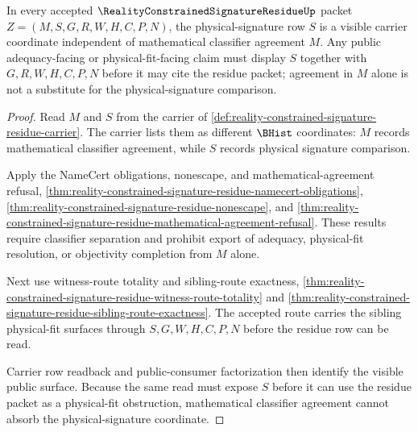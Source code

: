 \begin{theorem}
\label{thm:reality-constrained-signature-residue-physical-signature-separation}
In every accepted $\RealityConstrainedSignatureResidueUp$ packet $Z=(M,S,G,R,W,H,C,P,N)$, the physical-signature row $S$ is a visible carrier coordinate independent of mathematical classifier agreement $M$. Any public adequacy-facing or physical-fit-facing claim must display $S$ together with $G,R,W,H,C,P,N$ before it may cite the residue packet; agreement in $M$ alone is not a substitute for the physical-signature comparison.
\end{theorem}
\begin{proof}
Read $M$ and $S$ from the carrier of \autoref{def:reality-constrained-signature-residue-carrier}. The carrier lists them as different $\BHist$ coordinates: $M$ records mathematical classifier agreement, while $S$ records physical signature comparison.

Apply the NameCert obligations, nonescape, and mathematical-agreement refusal,
\autoref{thm:reality-constrained-signature-residue-namecert-obligations},
\autoref{thm:reality-constrained-signature-residue-nonescape}, and
\autoref{thm:reality-constrained-signature-residue-mathematical-agreement-refusal}. These results require classifier separation and prohibit export of adequacy, physical-fit resolution, or objectivity completion from $M$ alone.

Next use witness-route totality and sibling-route exactness,
\autoref{thm:reality-constrained-signature-residue-witness-route-totality} and
\autoref{thm:reality-constrained-signature-residue-sibling-route-exactness}. The accepted route carries the sibling physical-fit surfaces through $S,G,W,H,C,P,N$ before the residue row can be read.

Carrier row readback and public-consumer factorization then identify the visible public surface. Because the same read must expose $S$ before it can use the residue packet as a physical-fit obstruction, mathematical classifier agreement cannot absorb the physical-signature coordinate.
\end{proof}

